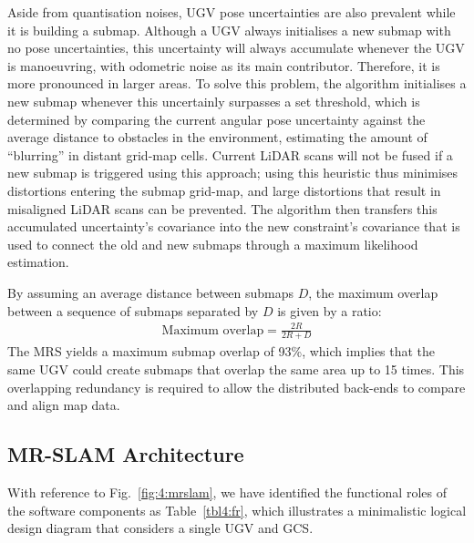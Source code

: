 Aside from quantisation noises, UGV pose uncertainties are also prevalent while it is building a submap. Although a UGV always initialises a new submap with no pose uncertainties, this uncertainty will always accumulate whenever the UGV is manoeuvring, with odometric noise as its main contributor. Therefore, it is more pronounced in larger areas. To solve this problem, the algorithm initialises a new submap whenever this uncertainly surpasses a set threshold, which is determined by comparing the current angular pose uncertainty against the average distance to obstacles in the environment, estimating the amount of “blurring” in distant grid-map cells. Current LiDAR scans will not be fused if a new submap is triggered using this approach; using this heuristic thus minimises distortions entering the submap grid-map, and large distortions that result in misaligned LiDAR scans can be prevented. The algorithm then transfers this accumulated uncertainty's covariance into the new constraint's covariance that is used to connect the old and new submaps through a maximum likelihood estimation.

By assuming an average distance between submaps $D$, the maximum overlap between a sequence of submaps separated by $D$ is given by a ratio:
\begin{align}
\text{Maximum overlap} = \frac{2R}{2R + D}
\end{align}
The MRS yields a maximum submap overlap of 93\%, which implies that the same UGV could create submaps that overlap the same area up to 15 times. This overlapping redundancy is required to allow the distributed back-ends to compare and align map data.


\subsection{MR-SLAM Architecture}
With reference to Fig.~\ref{fig:4:mrslam}, we have identified the functional roles of the software components as Table~\ref{tbl4:fr}, which illustrates a minimalistic logical design diagram that considers a single UGV and GCS.

